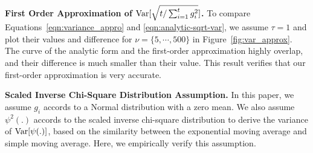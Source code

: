 \noindent\textbf{First Order Approximation of $\operatorname{{\rm Var}}[\sqrt{t/\sum_{i=1}^t g_i^2}]$.}
\label{subsec:approx}
To compare Equations~\ref{eqn:variance_appro} and \ref{eqn:analytic-sqrt-var}, we assume $\tau = 1$ and plot their values and difference for $\nu = \{5, \cdots, 500\}$ in Figure~\ref{fig:var_approx}.
The curve of the analytic form and the first-order approximation highly overlap, and their difference is much smaller than their value.
This result verifies that our first-order approximation is very accurate.%

\noindent\textbf{Scaled Inverse Chi-Square Distribution Assumption.}
\label{subsec:sma-ema}
In this paper, we assume $g_i$ accords to a Normal distribution with a zero mean. 
We also assume $\psi^2(.)$ accords to the scaled inverse chi-square distribution to derive the variance of $\operatorname{{\rm Var}}[\psi(.)]$,
based on the similarity between the exponential moving average and simple moving average.
Here, we empirically verify this assumption.

